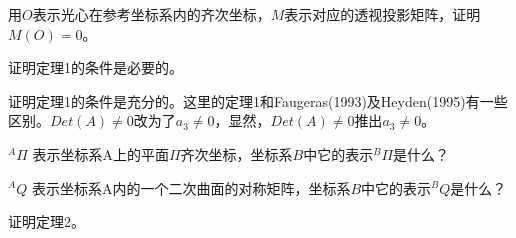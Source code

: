 \begin{problem}
    用$O$表示光心在参考坐标系内的齐次坐标，$M$表示对应的透视投影矩阵，证明$M(O)=0$。
\end{problem}

\begin{problem}
    证明定理1的条件是必要的。 
\end{problem}

\begin{problem}
    证明定理1的条件是充分的。这里的定理1和Faugeras(1993)及Heyden(1995)有一些区别。$Det(A)\ne 0$改为了$a_3\ne 0$，显然，$Det(A)\ne 0$推出$a_3\ne 0$。
\end{problem}

\begin{problem}
    $^{A}\Pi$ 表示坐标系A上的平面$\Pi$齐次坐标，坐标系$B$中它的表示$^{B}\Pi$是什么？
\end{problem}

\begin{problem}
    $^{A}Q$ 表示坐标系A内的一个二次曲面的对称矩阵，坐标系$B$中它的表示$^{B}Q$是什么？
\end{problem}

\begin{problem}
    证明定理2。 
\end{problem}

